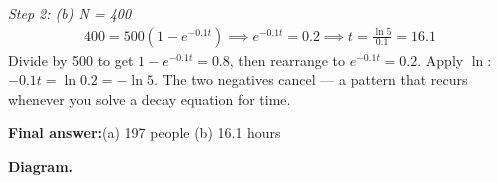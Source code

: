 \documentclass[11pt]{article}
\begin{document}
\textit{Step 2: (b) N = 400}
\[\begin{gathered}
400 = 500(1 - e^{-0.1t}) \implies e^{-0.1t} = 0.2 \implies t = \frac{\ln 5}{0.1} = 16.1
\end{gathered}\]
Divide by 500 to get \( 1 - e^{-0.1t} = 0.8 \), then rearrange to \( e^{-0.1t} = 0.2 \). Apply \( \ln \): \( -0.1t = \ln 0.2 = -\ln 5 \). The two negatives cancel --- a pattern that recurs whenever you solve a decay equation for time.

\begin{answerbox}
\textbf{Final answer:}\quad (a) 197 people (b) 16.1 hours
\end{answerbox}
\textbf{Diagram.}

\begin{center}
\end{center}
\end{document}
